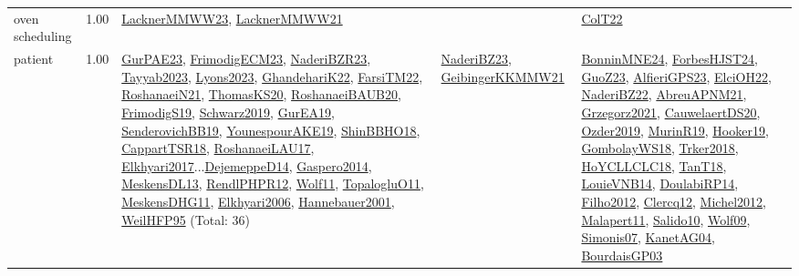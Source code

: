 {\begin{longtable}{p{3cm}r>{\raggedright\arraybackslash}p{6cm}>{\raggedright\arraybackslash}p{6cm}>{\raggedright\arraybackslash}p{8cm}}
\index{oven scheduling}\index{ApplicationAreas!oven scheduling}oven scheduling &  1.00 & \hyperref[detail:LacknerMMWW23]{LacknerMMWW23}, \hyperref[detail:LacknerMMWW21]{LacknerMMWW21} &  & \hyperref[detail:ColT22]{ColT22}\\
\index{patient}\index{ApplicationAreas!patient}patient &  1.00 & \hyperref[detail:GurPAE23]{GurPAE23}, \hyperref[detail:FrimodigECM23]{FrimodigECM23}, \hyperref[detail:NaderiBZR23]{NaderiBZR23}, \hyperref[detail:Tayyab2023]{Tayyab2023}, \hyperref[detail:Lyons2023]{Lyons2023}, \hyperref[detail:GhandehariK22]{GhandehariK22}, \hyperref[detail:FarsiTM22]{FarsiTM22}, \hyperref[detail:RoshanaeiN21]{RoshanaeiN21}, \hyperref[detail:ThomasKS20]{ThomasKS20}, \hyperref[detail:RoshanaeiBAUB20]{RoshanaeiBAUB20}, \hyperref[detail:FrimodigS19]{FrimodigS19}, \hyperref[detail:Schwarz2019]{Schwarz2019}, \hyperref[detail:GurEA19]{GurEA19}, \hyperref[detail:SenderovichBB19]{SenderovichBB19}, \hyperref[detail:YounespourAKE19]{YounespourAKE19}, \hyperref[detail:ShinBBHO18]{ShinBBHO18}, \hyperref[detail:CappartTSR18]{CappartTSR18}, \hyperref[detail:RoshanaeiLAU17]{RoshanaeiLAU17}, \hyperref[detail:Elkhyari2017]{Elkhyari2017}...\hyperref[detail:DejemeppeD14]{DejemeppeD14}, \hyperref[detail:Gaspero2014]{Gaspero2014}, \hyperref[detail:MeskensDL13]{MeskensDL13}, \hyperref[detail:RendlPHPR12]{RendlPHPR12}, \hyperref[detail:Wolf11]{Wolf11}, \hyperref[detail:TopalogluO11]{TopalogluO11}, \hyperref[detail:MeskensDHG11]{MeskensDHG11}, \hyperref[detail:Elkhyari2006]{Elkhyari2006}, \hyperref[detail:Hannebauer2001]{Hannebauer2001}, \hyperref[detail:WeilHFP95]{WeilHFP95} (Total: 36) & \hyperref[detail:NaderiBZ23]{NaderiBZ23}, \hyperref[detail:GeibingerKKMMW21]{GeibingerKKMMW21} & \hyperref[detail:BonninMNE24]{BonninMNE24}, \hyperref[detail:ForbesHJST24]{ForbesHJST24}, \hyperref[detail:GuoZ23]{GuoZ23}, \hyperref[detail:AlfieriGPS23]{AlfieriGPS23}, \hyperref[detail:ElciOH22]{ElciOH22}, \hyperref[detail:NaderiBZ22]{NaderiBZ22}, \hyperref[detail:AbreuAPNM21]{AbreuAPNM21}, \hyperref[detail:Grzegorz2021]{Grzegorz2021}, \hyperref[detail:CauwelaertDS20]{CauwelaertDS20}, \hyperref[detail:Ozder2019]{Ozder2019}, \hyperref[detail:MurinR19]{MurinR19}, \hyperref[detail:Hooker19]{Hooker19}, \hyperref[detail:GombolayWS18]{GombolayWS18}, \hyperref[detail:Trker2018]{Trker2018}, \hyperref[detail:HoYCLLCLC18]{HoYCLLCLC18}, \hyperref[detail:TanT18]{TanT18}, \hyperref[detail:LouieVNB14]{LouieVNB14}, \hyperref[detail:DoulabiRP14]{DoulabiRP14}, \hyperref[detail:Filho2012]{Filho2012}, \hyperref[detail:Clercq12]{Clercq12}, \hyperref[detail:Michel2012]{Michel2012}, \hyperref[detail:Malapert11]{Malapert11}, \hyperref[detail:Salido10]{Salido10}, \hyperref[detail:Wolf09]{Wolf09}, \hyperref[detail:Simonis07]{Simonis07}, \hyperref[detail:KanetAG04]{KanetAG04}, \hyperref[detail:BourdaisGP03]{BourdaisGP03}\\

\end{longtable}}
